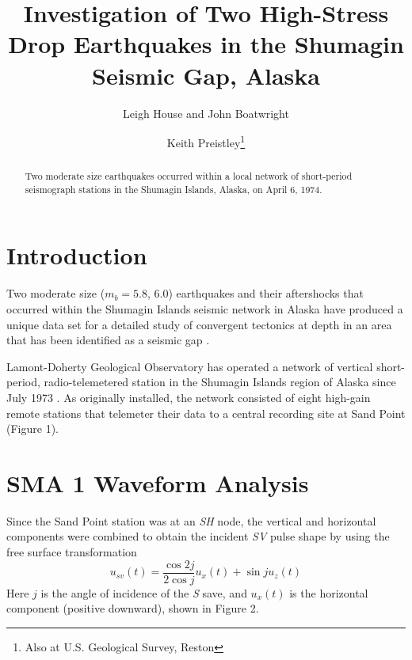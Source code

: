 

\title{Investigation of Two High-Stress Drop Earthquakes in the
  Shumagin Seismic Gap, Alaska}
\author{Leigh House and John Boatwright}
\address{Lamont-Doherty Geological Observatory and Department of
  Geological Sciences, Columbia University
  Palisades, New York}
\author{Keith Preistley\thanks{Also at U.S. Geological Survey, Reston}}
\address{Seismological Laboratory, Mackay School of Mines, University of
  Nevada at Reno}
\maketitle

\begin{abstract}
Two moderate size earthquakes occurred within a local network of
short-period seismograph stations in the Shumagin Islands, Alaska, on
April 6, 1974.
\end{abstract}

\section{Introduction}
Two moderate size ($m_b =5.8$, $6.0$) earthquakes and their
aftershocks that occurred within the Shumagin Islands seismic network
in Alaska have produced a unique data set for a detailed study of
convergent tectonics at depth in an area that has been identified as a
seismic gap \cite{kelleher}.

Lamont-Doherty Geological Observatory has operated a network of
vertical short-period, radio-telemetered station in the Shumagin
Islands region of Alaska since July 1973 \cite{davies}.  As originally
installed, the network consisted of eight high-gain remote stations that
telemeter their data to a central recording site at Sand Point (Figure 1).

\section{SMA 1 Waveform Analysis}
Since the Sand Point station was at an {\em SH\/} node, the vertical
and horizontal components were combined to obtain the incident {\em
SV\/} pulse shape by using the free surface transformation
\begin{equation}
u_{sv}(t) = \frac{\cos 2j}{2 \cos j} u_x(t) + \sin ju_z(t)
\end{equation}
Here $j$ is the angle of incidence of the {\em S\/} save, and $u_x(t)$
is the horizontal component (positive downward), shown in Figure 2.

